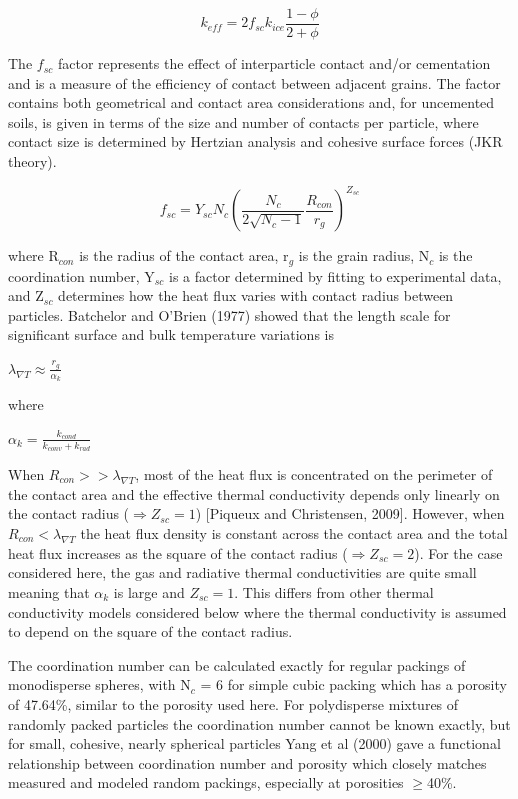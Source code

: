 \documentclass[11pt]{article} %
\begin{document}
	\begin{equation}
	k_{eff}=2 f_{sc} k_{ice} \frac{1-\phi}{2+\phi}
	\end{equation}
	
	The $f_{sc}$ factor represents the effect of interparticle contact and/or cementation and is a measure of the efficiency of contact between adjacent grains. The factor contains both geometrical and contact area considerations and, for uncemented soils, is given in terms of the size and number of contacts per particle, where contact size is determined by Hertzian analysis and cohesive surface forces (JKR theory).
	
	\begin{equation}
	f_{sc} = Y_{sc}N_{c} \left( \frac{N_{c}}{2\sqrt{N_{c}-1}} \frac{R_{con}}{r_{g}} \right)^{Z_{sc}}
	\end{equation}
	
	where R$_{con}$ is the radius of the contact area, r$_{g}$ is the grain radius, N$_{c}$ is the coordination number, Y$_{sc}$ is a factor determined by fitting to experimental data, and Z$_{sc}$ determines how the heat flux varies with contact radius between particles. Batchelor and O'Brien (1977) showed that the length scale for significant surface and bulk temperature variations is 
	
	$\lambda_{\nabla T} \approx \frac{r_{g}}{\alpha_{k}}$ 
	
	where 
	
	$\alpha_{k}=\frac{k_{cond}}{k_{conv}+k_{rad}}$
	
	When $R_{con} >> \lambda_{\nabla T}$, most of the heat flux is concentrated on the perimeter of the contact area and the effective thermal conductivity depends only linearly on the contact radius ($\Rightarrow Z_{sc} = 1$) [Piqueux and Christensen, 2009]. However, when $R_{con}<\lambda_{\nabla T}$ the heat flux density is constant across the contact area and the total heat flux increases as the square of the contact radius ($\Rightarrow Z_{sc} = 2$). For the case considered here, the gas and radiative thermal conductivities are quite small meaning that $\alpha_{k}$ is large and $Z_{sc} = 1$. This differs from other thermal conductivity models considered below where the thermal conductivity is assumed to depend on the square of the contact radius. 
	
	 The coordination number can be calculated exactly for regular packings of monodisperse spheres, with N$_{c}$ = 6 for simple cubic packing which has a porosity of 47.64\%, similar to the porosity used here. For polydisperse mixtures of randomly packed particles the coordination number cannot be known exactly, but for small, cohesive, nearly spherical particles Yang et al (2000) gave a functional relationship between coordination number and porosity which closely matches measured and modeled random packings, especially at porosities $\ge$40\%. 
	
\end{document}
